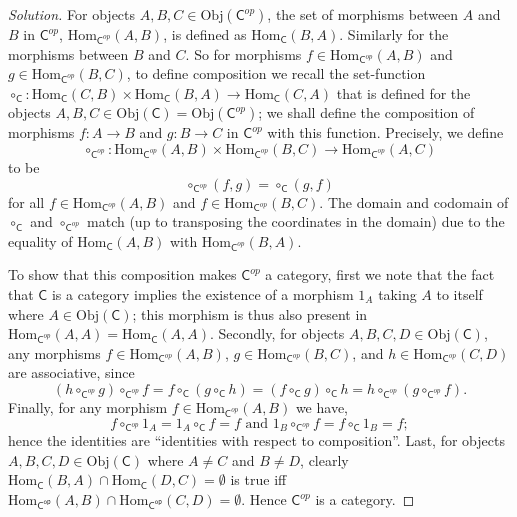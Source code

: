 \documentclass[fontsize=14pt]{scrartcl}
\theoremstyle{definition}
\newenvironment{solution}{
  \begin{proof}[Solution]
  \vspace{-8px}
  \setlength{\parskip}{4px}
  \setlength{\parindent}{0px}
}{
  \end{proof}
}
\newcommand{\Obj}{\mathrm{Obj}}
\newcommand{\Hom}{\mathrm{Hom}}
\begin{document}
\begin{solution}
For objects $A,B,C\in\Obj(\mathsf{C}^{op})$, the set of morphisms between $A$
and $B$ in $\mathsf{C}^{op}$, $\Hom_{\mathsf{C}^{op}}(A,B)$, is defined as
$\Hom_{\mathsf{C}}(B, A)$. Similarly for the morphisms between $B$ and $C$. So
for morphisms $f\in\Hom_{\mathsf{C}^{op}}(A,B)$ and
$g\in\Hom_{\mathsf{C}^{op}}(B,C)$, to define composition we recall the
set-function $\circ_{\mathsf{C}} : \Hom_{\mathsf{C}}(C,B) \times
\Hom_{\mathsf{C}}(B,A) \to\Hom_{\mathsf{C}}(C,A)$ that is defined for the
objects $A,B,C\in\Obj(\mathsf{C})=\Obj(\mathsf{C}^{op})$; we shall define the
composition of morphisms $f:A\to B$ and $g:B\to C$ in $\mathsf{C}^{op}$ with
this function. Precisely, we define
%
\[ \circ_{\mathsf{C}^{op}}: \Hom_{\mathsf{C}^{op}}(A,B) \times
\Hom_{\mathsf{C}^{op}}(B,C) \to \Hom_{\mathsf{C}^{op}}(A,C) \]
%
to be
%
\[ \circ_{\mathsf{C}^{op}}(f,g) = \circ_{\mathsf{C}}(g,f) \]
%
for all $f\in\Hom_{\mathsf{C}^{op}}(A,B)$ and $f\in\Hom_{\mathsf{C}^{op}}(B,C)$.
The domain and codomain of $\circ_{\mathsf{C}}$ and $\circ_{\mathsf{C}^{op}}$
match (up to transposing the coordinates in the domain) due to the equality of
$\Hom_{\mathsf{C}}(A,B)$ with $\Hom_{\mathsf{C}^{op}}(B,A)$.

To show that this composition makes $\mathsf{C}^{op}$ a category, first we note
that the fact that $\mathsf{C}$ is a category implies the existence of a
morphism $1_{A}$ taking $A$ to itself where $A\in\Obj(\mathsf{C})$; this
morphism is thus also present in $\Hom_{\mathsf{C}^{op}}(A,A) =
\Hom_{\mathsf{C}}(A,A)$. Secondly, for objects $A,B,C,D\in\Obj(\mathsf{C})$, any
morphisms $f\in\Hom_{\mathsf{C}^{op}}(A,B)$, $g\in\Hom_{\mathsf{C}^{op}}(B,C)$,
and $h\in\Hom_{\mathsf{C}^{op}}(C,D)$ are associative, since
%
\[ (h \circ_{\mathsf{C}^{op}} g) \circ_{\mathsf{C}^{op}} f = f
\circ_{\mathsf{C}} (g \circ_{\mathsf{C}} h) = (f \circ_{\mathsf{C}} g)
\circ_{\mathsf{C}} h = h \circ_{\mathsf{C}^{op}} (g \circ_{\mathsf{C}^{op}} f).
\]
%
Finally, for any morphism $f\in\Hom_{\mathsf{C}^{op}}(A,B)$ we have,
%
\[ f \circ_{\mathsf{C}^{op}} 1_A = 1_A \circ_{\mathsf{C}} f = f \text{ and }
1_B \circ_{\mathsf{C}^{op}} f = f \circ_{\mathsf{C}} 1_B = f; \]
%
hence the identities are ``identities with respect to composition''. Last, for
objects $A,B,C,D\in\Obj(\mathsf{C})$ where $A\neq C$ and $B\neq D$,
clearly $\Hom_{\mathsf{C}}(B,A)\cap\Hom_{\mathsf{C}}(D,C)=\emptyset$ is true iff 
$\Hom_{\mathsf{C^{op}}}(A,B)\cap\Hom_{\mathsf{C^{op}}}(C,D)=\emptyset$. Hence
$\mathsf{C}^{op}$ is a category.
\end{solution}
\end{document}
